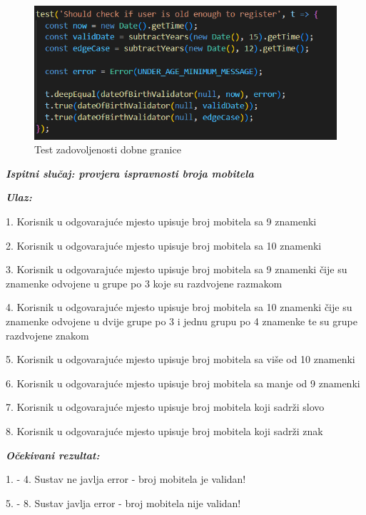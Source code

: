 \begin{figure}[H]
			\includegraphics[scale=0.5]{slike/ageTest.PNG} %
			\centering
			\caption{Test zadovoljenosti dobne granice}
			\label{fig:aaa}
			
		\end{figure}
	
	 \textbf{\textit{Ispitni slučaj: provjera ispravnosti broja mobitela}}

            \textbf{\textit{Ulaz:}}

             1. Korisnik u odgovarajuće mjesto upisuje broj mobitela sa 9 znamenki

             2. Korisnik u odgovarajuće mjesto upisuje broj mobitela sa 10 znamenki

             3. Korisnik u odgovarajuće mjesto upisuje broj mobitela sa 9 znamenki čije su znamenke odvojene u grupe po 3 koje su razdvojene razmakom

             4. Korisnik u odgovarajuće mjesto upisuje broj mobitela sa 10 znamenki čije su znamenke odvojene u dvije grupe po 3 i jednu grupu po 4 znamenke te su grupe razdvojene znakom 

             5. Korisnik u odgovarajuće mjesto upisuje broj mobitela sa više od 10 znamenki

             6. Korisnik u odgovarajuće mjesto upisuje broj mobitela sa manje od 9 znamenki

             7. Korisnik u odgovarajuće mjesto upisuje broj mobitela koji sadrži slovo

             8. Korisnik u odgovarajuće mjesto upisuje broj mobitela koji sadrži znak 

            \textbf{\textit{Očekivani rezultat:}}

             1. - 4. Sustav ne javlja error - broj mobitela je validan!

             5. - 8. Sustav javlja error - broj mobitela nije validan!

